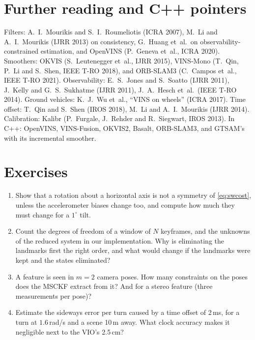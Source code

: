 \section*{Further reading and C++ pointers}

Filters: A.~I.~Mourikis and S.~I.~Roumeliotis (ICRA 2007), M.~Li and
A.~I.~Mourikis (IJRR 2013) on consistency, G.~Huang et~al.\ on
observability-constrained estimation, and OpenVINS (P.~Geneva et~al.,
ICRA 2020). Smoothers: OKVIS (S.~Leutenegger et~al., IJRR 2015),
VINS-Mono (T.~Qin, P.~Li and S.~Shen, IEEE T-RO 2018), and ORB-SLAM3
(C.~Campos et~al., IEEE T-RO 2021). Observability: E.~S.~Jones and
S.~Soatto (IJRR 2011), J.~Kelly and G.~S.~Sukhatme (IJRR 2011),
J.~A.~Hesch et~al.\ (IEEE T-RO 2014). Ground vehicles: K.~J.~Wu et~al.,
``VINS on wheels'' (ICRA 2017). Time offset: T.~Qin and S.~Shen (IROS
2018), M.~Li and A.~I.~Mourikis (IJRR 2014). Calibration: Kalibr
(P.~Furgale, J.~Rehder and R.~Siegwart, IROS 2013). In C++: OpenVINS,
VINS-Fusion, OKVIS2, Basalt, ORB-SLAM3, and GTSAM's
 with its incremental smoother.

\FloatBarrier
\section*{Exercises}

\begin{enumerate}[label=\textbf{13.\arabic*},ref=13.\arabic*]
\item\label{ex:13null} Show that a rotation about a horizontal axis is
  not a symmetry of \eqref{eq:swcost}, unless the accelerometer biases
  change too, and compute how much they must change for a $1^\circ$ tilt.
\item\label{ex:13count} Count the degrees of freedom of a window of $N$
  keyframes, and the unknowns of the reduced system in our
  implementation. Why is eliminating the landmarks first the right
  order, and what would change if the landmarks were kept and the states
  eliminated?
\item\label{ex:13msckf} A feature is seen in $m=2$ camera poses. How
  many constraints on the poses does the MSCKF extract from it? And for
  a stereo feature (three measurements per pose)?
\item\label{ex:13td} Estimate the sideways error per turn caused by a
  time offset of 2\,ms, for a turn at $1.6$\,rad/s and a scene 10\,m
  away. What clock accuracy makes it negligible next to the VIO's
  2.5\,cm?
\end{enumerate}

